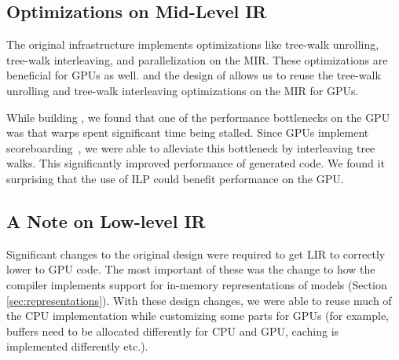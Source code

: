 \subsection{Optimizations on Mid-Level IR}
The original \TreebeardOLD{} infrastructure implements optimizations like 
tree-walk unrolling, tree-walk interleaving, and parallelization
on the MIR. These optimizations are beneficial for GPUs as well.
and the design of \TreebeardOLD{} allows us to reuse the tree-walk 
unrolling and tree-walk interleaving optimizations on the MIR for GPUs.

While building \Treebeard{}, we found that one of the performance bottlenecks on the 
GPU was that warps spent significant time being stalled. Since GPUs 
implement scoreboarding~\cite{HennesseyPatterson}, we were able to alleviate this bottleneck by
interleaving tree walks. This significantly improved performance of generated 
code. We found it surprising that the use of ILP could benefit 
performance on the GPU.  

\subsection{A Note on Low-level IR}
Significant changes to the original \TreebeardOLD{} design were required to get
LIR to correctly lower to GPU code. The most important of these was 
the change to how the compiler implements support for in-memory 
representations of models (Section \ref{sec:representations}).
With these design changes, we were able to reuse much of the CPU 
implementation while customizing some parts for GPUs (for example,
buffers need to be allocated differently for CPU and GPU, caching 
is implemented differently etc.). 
